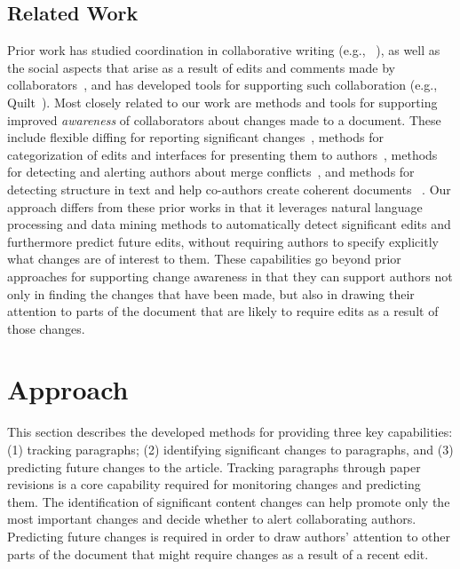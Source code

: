 \subsection{Related Work}\label{related-work}

Prior work has studied coordination in collaborative writing (e.g.,
~\cite{neuwirth2001computer,kittur2007he}), as well as the social
aspects that arise as a result of edits and comments made by
collaborators~\cite{birnholtz2012tracking,birnholtz2013write}, and has
developed tools for supporting such collaboration (e.g.,
Quilt~\cite{fish1988quilt}). Most closely related to our work are
methods and tools for supporting improved \emph{awareness} of
collaborators about changes made to a document. These include flexible
diffing for reporting significant changes~\cite{neuwirth1992flexible},
methods for categorization of edits and interfaces for presenting them
to
authors~\cite{fong2010did,papadopoulou2007structured,tam2006framework},
methods for detecting and alerting authors about merge
conflicts~\cite{hainsworth2006enabling}, and methods for detecting
structure in text and help co-authors create coherent documents~
\cite{de2007narrative}. Our approach differs from these prior works in
that it leverages natural language processing and data mining methods to
automatically detect significant edits and furthermore predict future
edits, without requiring authors to specify explicitly what changes are
of interest to them. These capabilities go beyond prior approaches for
supporting change awareness in that they can support authors not only in
finding the changes that have been made, but also in drawing their
attention to parts of the document that are likely to require edits as a
result of those changes.

\section{Approach}\label{approach}

This section describes the developed methods for providing three key
capabilities: (1) tracking paragraphs; (2) identifying significant
changes to paragraphs, and (3) predicting future changes to the article.
Tracking paragraphs through paper revisions is a core capability
required for monitoring changes and predicting them. The identification
of significant content changes can help promote only the most important
changes and decide whether to alert collaborating authors. Predicting
future changes is required in order to draw authors' attention to other
parts of the document that might require changes as a result of a recent
edit.

